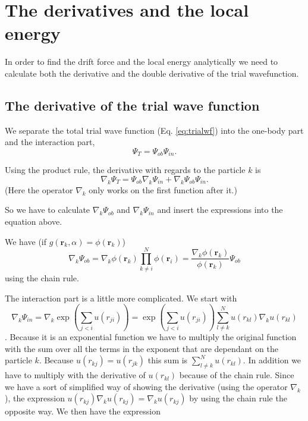 \section{The derivatives and the local energy}

In order to find the drift force and the local energy analytically we need to calculate both the derivative and the double derivative of the trial wavefunction.

\subsection{The derivative of the trial wave function}

We separate the total trial wave function (Eq. \ref{eq:trialwf}) into the one-body part and the interaction part,
\begin{equation}
\Psi_T = \Psi_{ob}\Psi_{in}.
\end{equation}

Using the product rule, the derivative with regards to the particle $k$ is
$$ \nabla_k \Psi_T =  \Psi_{ob}\nabla_k\Psi_{in} + \nabla_k\Psi_{ob}\Psi_{in}.$$
(Here the operator $\nabla_k$ only works on the first function after it.)

So we have to calculate $\nabla_k\Psi_{ob}$ and $\nabla_k\Psi_{in}$ and insert the expressions into the equation above.

We have (if $g(\mathbf{r}_k,\alpha) = \phi(\mathbf{r}_k)$)
\begin{equation}\label{eq:psi_ob_derivative}
\nabla_k\Psi_{ob} = \nabla_k \phi(\mathbf{r}_k)\prod_{k\neq i}^N \phi(\mathbf{r}_i)= \frac{\nabla_k \phi(\mathbf{r}_k)}{\phi(\mathbf{r}_k)} \Psi_{ob}
\end{equation}
using the chain rule.

The interaction part is a little more complicated. We start with
$$ \nabla_k\Psi_{in} = \nabla_k  \exp{\left(\sum_{j<i}u(r_{ji})\right)} = \exp{\left(\sum_{j<i}u(r_{ji})\right)} \sum^N_{l \neq k}  u\left(r_{kl}\right) \nabla_k u (r_{kl}) $$. Because it is an exponential function we have to multiply the original function with the sum over all the terms in the exponent that are dependant on the particle $k$. Because $u(r_{kj}) = u(r_{jk})$ this sum is $\sum^N_{l \neq k}  u\left(r_{kl}\right)$. In addition we have to multiply with the derivative of $u(r_{kl})$ because of the chain rule. Since we have a sort of simplified way of showing the derivative (using the operator $\nabla_k$), the expression $u(r_{kj})\nabla_k u(r_{kj}) = \nabla_k u(r_{kj})$ by using the chain rule the opposite way. We then have the expression

